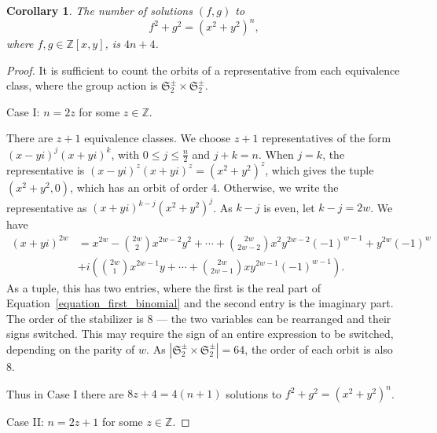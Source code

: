 \documentclass[12pt]{article}
\newtheorem{corollary}[theorem]{Corollary}
\theoremstyle{definition}
\theoremstyle{remark}
\newcommand{\Zzz}{\mathbb Z}
\numberwithin{equation}{section}
\begin{document}
\begin{corollary}

The number of solutions \( (f, g) \) to
\[
f^2 + g^2 = (x^2 + y^2)^n,
\]
where \( f, g \in \Zzz[x,y] \), is \(4n + 4\).

\end{corollary}
\begin{proof}
It is sufficient to count the orbits of a representative from each
equivalence class, where the group action is
\( \mathfrak{S}_2^\pm \times \mathfrak{S}_2^\pm \).

\noindent
Case I: \( n = 2z \) for some \( z \in \Zzz \).

There are \( z + 1 \) equivalence classes. We choose \( z + 1 \)
representatives of the form \( (x - yi)^j (x + yi)^k \), with
\( 0 \leq j \leq \frac{n}{2}\) and \( j + k = n \).
When \( j = k \), the representative
is \( (x - yi)^z (x + yi)^z = ( x^2 + y^2 ) ^ z \), which
gives the tuple \( ( x^2 + y^2, 0 ) \), which has an orbit of order 4.
Otherwise, we write the representative as \( (x + yi)^{k-j} (x^2 + y^2)^j \).
As \( k - j \) is even, let \( k - j = 2w \). We have
\begin{align}
\label{equation_first_binomial}
(x + yi) ^ {2w} &= x ^ {2w} - \binom{2w}{2}  x^{2w - 2 } y^2
+ \cdots + \binom{2w}{2w-2} x^2 y^{2w - 2} (-1) ^ {w - 1}
+  y^{2w} (-1) ^ {w} \nonumber
\\
&+ i \left( \binom{2w}{1} x ^ {2w - 1} y + \cdots +
\binom{2w}{2w-1}  x y ^ {2w -1} (-1)^{w-1} \right).
\end{align}
As a tuple, this has two entries, where the first is the real part
of Equation~\ref{equation_first_binomial} and the second entry
is the imaginary part.
The order of the stabilizer is 8 --- the two variables can be rearranged and their
signs switched. This may require the sign of an entire expression to be switched,
depending on the parity of \( w \).
As \( | \mathfrak{S}_2^\pm \times \mathfrak{S}_2^\pm | = 64\), the order of each orbit
is also 8. 

Thus in Case I there are \( 8z + 4 = 4 (n + 1 ) \) solutions
to \( f^2 + g^2 = (x^2 + y^2)^n \).



\noindent
Case II: \( n = 2z + 1\) for some \( z \in \Zzz \).


\end{proof}
\end{document}
